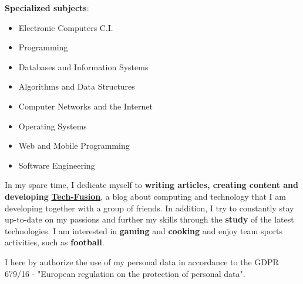 

\textbf{Specialized subjects}: %

\begin{itemize}
    \item Electronic Computers C.I.
    \item Programming
    \item Databases and Information Systems
    \item Algorithms and Data Structures
    \item Computer Networks and the Internet
    \item Operating Systems
    \item Web and Mobile Programming
    \item Software Engineering
\end{itemize}





In my spare time, I dedicate myself to \textbf{writing articles, creating content and developing} \href{https://tech-fusion.it/}{\textbf{Tech-Fusion}}, a blog about computing and technology that I am developing together with a group of friends. In addition, I try to constantly stay up-to-date on my passions and further my skills through the \textbf{study} of the latest technologies. I am interested in \textbf{gaming} and \textbf{cooking} and enjoy team sports activities, such as \textbf{football}.


\divider

\footnotesize{I here by authorize the use of my personal data in accordance to the GDPR 679/16 - "European regulation on the protection of personal data".}
